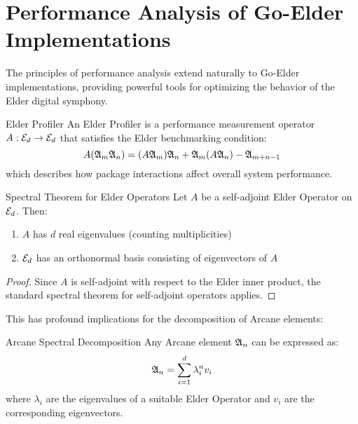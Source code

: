 \section{Performance Analysis of Go-Elder Implementations}

\begin{twocolumnlayout}
The principles of performance analysis extend naturally to Go-Elder implementations, providing powerful tools for optimizing the behavior of the Elder digital symphony.

\begin{definition}{Elder Profiler}{}
An Elder Profiler is a performance measurement operator $A: \mathcal{E}_{d} \to \mathcal{E}_{d}$ that satisfies the Elder benchmarking condition:
\begin{equation}
A(\mathfrak{A}_{m}\mathfrak{A}_{n}) = (A\mathfrak{A}_{m})\mathfrak{A}_{n} + \mathfrak{A}_{m}(A\mathfrak{A}_{n}) - \mathfrak{A}_{m+n-1}
\end{equation}
which describes how package interactions affect overall system performance.
\end{definition}

\begin{theorem}{Spectral Theorem for Elder Operators}{}
Let $A$ be a self-adjoint Elder Operator on $\mathcal{E}_{d}$. Then:
\begin{enumerate}
\item $A$ has $d$ real eigenvalues (counting multiplicities)
\item $\mathcal{E}_{d}$ has an orthonormal basis consisting of eigenvectors of $A$
\end{enumerate}
\end{theorem}

\begin{proof}
Since $A$ is self-adjoint with respect to the Elder inner product, the standard spectral theorem for self-adjoint operators applies.
\end{proof}

This has profound implications for the decomposition of Arcane elements:

\begin{corollary}{Arcane Spectral Decomposition}{}
Any Arcane element $\mathfrak{A}_{n}$ can be expressed as:
\begin{equation}
\mathfrak{A}_{n} = \sum_{i=1}^{d} \lambda_i^n v_i
\end{equation}
where $\lambda_i$ are the eigenvalues of a suitable Elder Operator and $v_i$ are the corresponding eigenvectors.
\end{corollary}


\end{twocolumnlayout}
